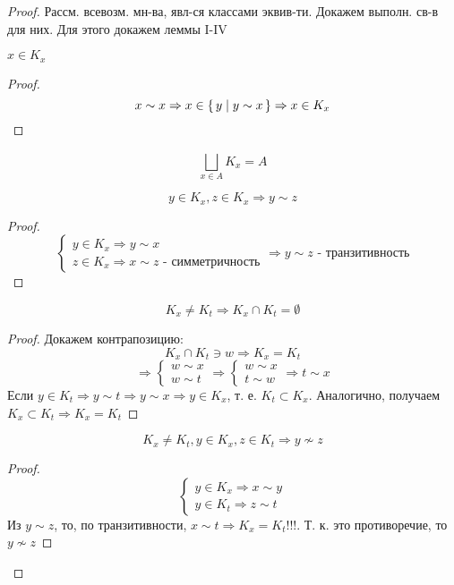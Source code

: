 \begin{proof}
Рассм. всевозм. мн-ва, явл-ся классами эквив-ти. Докажем выполн. св-в для них. Для этого докажем леммы I-IV
\begin{lemma}[I]
$x \in K_x$
\end{lemma}
\begin{proof}
\[
x \sim x \Rightarrow x \in \set{y | y \sim x} \Rightarrow x \in K_x
\]
\end{proof}
\begin{consequence}
\[
\bigsqcup_{x \in A}^{}K_x = A
\]
\end{consequence}
\begin{lemma}[II]
\[
  y \in K_x, z \in K_x \Rightarrow y \sim z
\]
\end{lemma}
\begin{proof}
\[
\begin{cases}
y \in K_x \Rightarrow y \sim x \\
z \in K_x \Rightarrow x \sim z \text{ - симметричность}
\end{cases} \Rightarrow y \sim z \text{ - транзитивность}
\]
\end{proof}
\begin{lemma}[III]
\[
K_x \neq K_t \Rightarrow K_x \cap K_t = \emptyset
\]
\end{lemma}
\begin{proof}
  Докажем контрапозицию:
\[
K_x \cap K_t \ni w \Rightarrow K_x = K_t
\]
\[
\Rightarrow 
\begin{cases}
w \sim x \\
w \sim t
\end{cases} \Rightarrow
\begin{cases}
w \sim x \\
t \sim w
\end{cases} \Rightarrow t \sim x
\]
Если $y \in K_t \Rightarrow y \sim t \Rightarrow y \sim x \Rightarrow y \in K_x$, т. е. $K_t \subset K_x$. Аналогично, получаем $K_x \subset K_t \Rightarrow K_x = K_t$
\end{proof}
\begin{lemma}[IV]
\[
K_x \neq K_t, y \in K_x, z \in K_t \Rightarrow y \not\sim z
\]
\end{lemma}
\begin{proof}
\[
\begin{cases}
y \in K_x \Rightarrow x \sim y \\
y \in K_t \Rightarrow z \sim t
\end{cases}
\]
Из $y \sim z$, то, по транзитивности, $x \sim t \Rightarrow K_x = K_t!!!$. Т. к. это противоречие, то $y \not\sim z$
\end{proof}
\end{proof}

